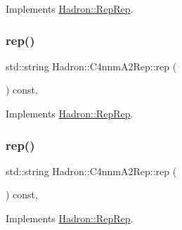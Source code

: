 Implements \mbox{\hyperlink{structHadron_1_1RepRep_ab3213025f6de249f7095892109575fde}{Hadron\+::\+Rep\+Rep}}.

\mbox{\label{structHadron_1_1C4nnmA2Rep_a087273219d3b72971b2891ff00719c5a}} 
\subsubsection{\texorpdfstring{rep()}{rep()}\hspace{0.1cm}{\footnotesize\ttfamily [3/5]}}
{\footnotesize\ttfamily std\+::string Hadron\+::\+C4nnm\+A2\+Rep\+::rep (\begin{DoxyParamCaption}{ }\end{DoxyParamCaption}) const\hspace{0.3cm}{\ttfamily [inline]}, {\ttfamily [virtual]}}



Implements \mbox{\hyperlink{structHadron_1_1RepRep_ab3213025f6de249f7095892109575fde}{Hadron\+::\+Rep\+Rep}}.

\mbox{\label{structHadron_1_1C4nnmA2Rep_a087273219d3b72971b2891ff00719c5a}} 
\subsubsection{\texorpdfstring{rep()}{rep()}\hspace{0.1cm}{\footnotesize\ttfamily [4/5]}}
{\footnotesize\ttfamily std\+::string Hadron\+::\+C4nnm\+A2\+Rep\+::rep (\begin{DoxyParamCaption}{ }\end{DoxyParamCaption}) const\hspace{0.3cm}{\ttfamily [inline]}, {\ttfamily [virtual]}}



Implements \mbox{\hyperlink{structHadron_1_1RepRep_ab3213025f6de249f7095892109575fde}{Hadron\+::\+Rep\+Rep}}.

\mbox{\label{structHadron_1_1C4nnmA2Rep_a087273219d3b72971b2891ff00719c5a}} 
